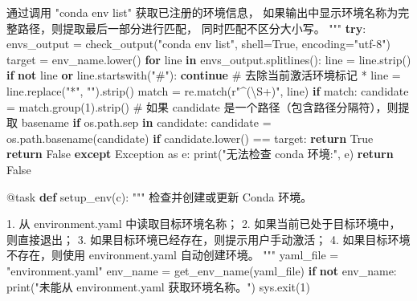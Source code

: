 \documentclass[
  letterpaper,
  DIV=11,
  numbers=noendperiod]{scrreprt}
\newenvironment{Shaded}{\begin{snugshade}}{\end{snugshade}}
\newcommand{\AttributeTok}[1]{\textcolor[rgb]{0.40,0.45,0.13}{#1}}
\newcommand{\BuiltInTok}[1]{\textcolor[rgb]{0.00,0.23,0.31}{#1}}
\newcommand{\CommentTok}[1]{\textcolor[rgb]{0.37,0.37,0.37}{#1}}
\newcommand{\ControlFlowTok}[1]{\textcolor[rgb]{0.00,0.23,0.31}{\textbf{#1}}}
\newcommand{\DecValTok}[1]{\textcolor[rgb]{0.68,0.00,0.00}{#1}}
\newcommand{\ImportTok}[1]{\textcolor[rgb]{0.00,0.46,0.62}{#1}}
\newcommand{\KeywordTok}[1]{\textcolor[rgb]{0.00,0.23,0.31}{\textbf{#1}}}
\newcommand{\NormalTok}[1]{\textcolor[rgb]{0.00,0.23,0.31}{#1}}
\newcommand{\OperatorTok}[1]{\textcolor[rgb]{0.37,0.37,0.37}{#1}}
\newcommand{\PreprocessorTok}[1]{\textcolor[rgb]{0.68,0.00,0.00}{#1}}
\newcommand{\StringTok}[1]{\textcolor[rgb]{0.13,0.47,0.30}{#1}}
\newcommand{\VariableTok}[1]{\textcolor[rgb]{0.07,0.07,0.07}{#1}}
\newcommand{\VerbatimStringTok}[1]{\textcolor[rgb]{0.13,0.47,0.30}{#1}}
\begin{document}
\begin{Shaded}
\begin{Highlighting}[]
\CommentTok{    通过调用 "conda env list" 获取已注册的环境信息，}
\CommentTok{    如果输出中显示环境名称为完整路径，则提取最后一部分进行匹配，}
\CommentTok{    同时匹配不区分大小写。}
\CommentTok{    """}
    \ControlFlowTok{try}\NormalTok{:}
\NormalTok{        envs\_output }\OperatorTok{=}\NormalTok{ check\_output(}\StringTok{"conda env list"}\NormalTok{, shell}\OperatorTok{=}\VariableTok{True}\NormalTok{, encoding}\OperatorTok{=}\StringTok{"utf{-}8"}\NormalTok{)}
\NormalTok{        target }\OperatorTok{=}\NormalTok{ env\_name.lower()}
        \ControlFlowTok{for}\NormalTok{ line }\KeywordTok{in}\NormalTok{ envs\_output.splitlines():}
\NormalTok{            line }\OperatorTok{=}\NormalTok{ line.strip()}
            \ControlFlowTok{if} \KeywordTok{not}\NormalTok{ line }\KeywordTok{or}\NormalTok{ line.startswith(}\StringTok{"\#"}\NormalTok{):}
                \ControlFlowTok{continue}
            \CommentTok{\# 去除当前激活环境标记 \textquotesingle{}*\textquotesingle{}}
\NormalTok{            line }\OperatorTok{=}\NormalTok{ line.replace(}\StringTok{"*"}\NormalTok{, }\StringTok{""}\NormalTok{).strip()}
\NormalTok{            match }\OperatorTok{=}\NormalTok{ re.match(}\VerbatimStringTok{r"\^{}(\textbackslash{}S+)"}\NormalTok{, line)}
            \ControlFlowTok{if}\NormalTok{ match:}
\NormalTok{                candidate }\OperatorTok{=}\NormalTok{ match.group(}\DecValTok{1}\NormalTok{).strip()}
                \CommentTok{\# 如果 candidate 是一个路径（包含路径分隔符），则提取 basename}
                \ControlFlowTok{if}\NormalTok{ os.path.sep }\KeywordTok{in}\NormalTok{ candidate:}
\NormalTok{                    candidate }\OperatorTok{=}\NormalTok{ os.path.basename(candidate)}
                \ControlFlowTok{if}\NormalTok{ candidate.lower() }\OperatorTok{==}\NormalTok{ target:}
                    \ControlFlowTok{return} \VariableTok{True}
        \ControlFlowTok{return} \VariableTok{False}
    \ControlFlowTok{except} \PreprocessorTok{Exception} \ImportTok{as}\NormalTok{ e:}
        \BuiltInTok{print}\NormalTok{(}\StringTok{"无法检查 conda 环境:"}\NormalTok{, e)}
        \ControlFlowTok{return} \VariableTok{False}

\AttributeTok{@task}
\KeywordTok{def}\NormalTok{ setup\_env(c):}
    \CommentTok{"""}
\CommentTok{    检查并创建或更新 Conda 环境。}

\CommentTok{      1. 从 environment.yaml 中读取目标环境名称；}
\CommentTok{      2. 如果当前已处于目标环境中，则直接退出；}
\CommentTok{      3. 如果目标环境已经存在，则提示用户手动激活；}
\CommentTok{      4. 如果目标环境不存在，则使用 environment.yaml 自动创建环境。}
\CommentTok{    """}
\NormalTok{    yaml\_file }\OperatorTok{=} \StringTok{"environment.yaml"}
\NormalTok{    env\_name }\OperatorTok{=}\NormalTok{ get\_env\_name(yaml\_file)}
    \ControlFlowTok{if} \KeywordTok{not}\NormalTok{ env\_name:}
        \BuiltInTok{print}\NormalTok{(}\StringTok{"未能从 environment.yaml 获取环境名称。"}\NormalTok{)}
\NormalTok{        sys.exit(}\DecValTok{1}\NormalTok{)}


\end{Highlighting}
\end{Shaded}
\end{document}

